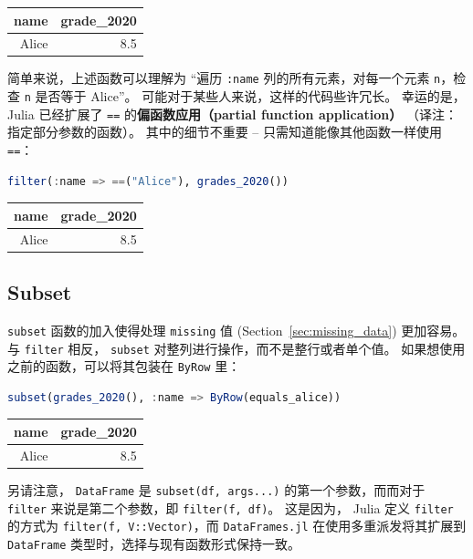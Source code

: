 \documentclass[
  notoc %
]{tufte-book}
\newcommand{\passthrough}[1]{#1}
\begin{document}
\begin{longtable}[]{@{}rr@{}}
\toprule
name & grade\_2020 \\
\midrule
\endhead
Alice & 8.5 \\
\bottomrule
\end{longtable}

简单来说，上述函数可以理解为 ``遍历 \passthrough{\lstinline!:name!}
列的所有元素，对每一个元素 \passthrough{\lstinline!n!}，检查
\passthrough{\lstinline!n!} 是否等于 Alice''。
可能对于某些人来说，这样的代码些许冗长。 幸运的是，Julia 已经扩展了
\passthrough{\lstinline!==!} 的\textbf{偏函数应用（partial function
application）} （译注：指定部分参数的函数）。 其中的细节不重要 --
只需知道能像其他函数一样使用 \passthrough{\lstinline!==!}：

\begin{lstlisting}[language=Julia]
filter(:name => ==("Alice"), grades_2020())
\end{lstlisting}

\begin{longtable}[]{@{}rr@{}}
\toprule
name & grade\_2020 \\
\midrule
\endhead
Alice & 8.5 \\
\bottomrule
\end{longtable}

\hypertarget{sec:subset}{%
\subsection{Subset}\label{sec:subset}}

\passthrough{\lstinline!subset!} 函数的加入使得处理
\passthrough{\lstinline!missing!} 值 (Section~\ref{sec:missing_data})
更加容易。 与 \passthrough{\lstinline!filter!} 相反，
\passthrough{\lstinline!subset!} 对整列进行操作，而不是整行或者单个值。
如果想使用之前的函数，可以将其包装在 \passthrough{\lstinline!ByRow!}
里：

\begin{lstlisting}[language=Julia]
subset(grades_2020(), :name => ByRow(equals_alice))
\end{lstlisting}

\begin{longtable}[]{@{}rr@{}}
\toprule
name & grade\_2020 \\
\midrule
\endhead
Alice & 8.5 \\
\bottomrule
\end{longtable}

另请注意， \passthrough{\lstinline!DataFrame!} 是
\passthrough{\lstinline!subset(df, args...)!} 的第一个参数，而而对于
\passthrough{\lstinline!filter!} 来说是第二个参数，即
\passthrough{\lstinline!filter(f, df)!}。 这是因为， Julia 定义
\passthrough{\lstinline!filter!} 的方式为
\passthrough{\lstinline!filter(f, V::Vector)!}，而
\passthrough{\lstinline!DataFrames.jl!} 在使用多重派发将其扩展到
\passthrough{\lstinline!DataFrame!} 类型时，选择与现有函数形式保持一致。
\end{document}
